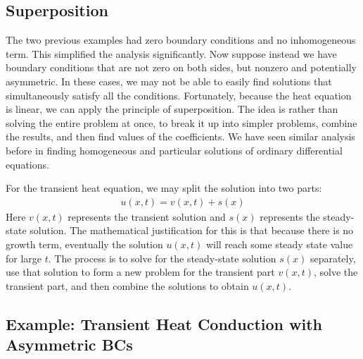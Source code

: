\subsection{Superposition}

The two previous examples had zero boundary conditions and no inhomogeneous term. This simplified the analysis significantly. Now suppose instead we have boundary conditions that are not zero on both sides, but nonzero and potentially asymmetric. In these cases, we may not be able to easily find solutions that simultaneously satisfy all the conditions. Fortunately, because the heat equation is linear, we can apply the principle of superposition. The idea is rather than solving the entire problem at once, to break it up into simpler problems, combine the results, and then find values of the coefficients. We have seen similar analysis before in finding homogeneous and particular solutions of ordinary differential equations.

For the transient heat equation, we may split the solution into two parts:
\begin{align}
  u(x,t) = v(x,t) + s(x)
\end{align}
Here $v(x,t)$ represents the transient solution and $s(x)$ represents the steady-state solution. The mathematical justification for this is that because there is no growth term, eventually the solution $u(x,t)$ will reach some steady state value for large $t$. The process is to solve for the steady-state solution $s(x)$ separately, use that solution to form a new problem for the transient part $v(x,t)$, solve the transient part, and then combine the solutions to obtain $u(x,t)$.



\subsection{Example: Transient Heat Conduction with Asymmetric BCs}

